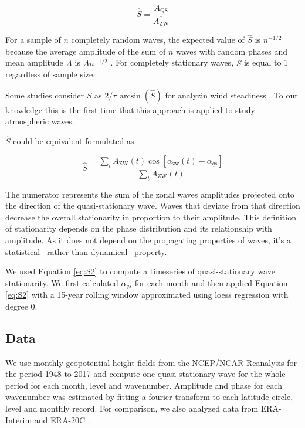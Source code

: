 \documentclass[draft,linenumbers]{agujournal2018}
\begin{document}
\begin{linenomath*}
\begin{equation}\label{eq:S}
\hat{S} = \frac{A_\mathrm{QS}}{\overline{A_\mathrm{ZW}}}
\end{equation}
\end{linenomath*}

For a sample of \(n\) completely random waves, the expected value of
\(\hat{S}\) is \(n^{-1/2}\) because the average amplitude of the sum of
\(n\) waves with random phases and mean amplitude \(A\) is \(An^{-1/2}\)
\citep{pain2005}. For completely stationary waves, \(\hat{S}\) is equal
to 1 regardless of sample size.

Some studies consider \(\hat{S}\) as
\(2/\pi\arcsin \left (\hat{S} \right )\) \citep{singer1967} for analyzin
wind steadiness \citep[e.g][]{hiscox2010}. To our knowledge this is the
first time that this approach is applied to study atmospheric waves.

\(\hat{S}\) could be equivalent formulated as

\begin{linenomath*}
\begin{equation}\label{eq:S2}
\hat{S} =   \frac{\sum_t A_\mathrm{ZW}(t) \cos  \left [\alpha_\mathrm{zw}(t) - \alpha_{qs} \right ]}{\sum_t A_\mathrm{ZW}(t)}
\end{equation}
\end{linenomath*}

The numerator represents the sum of the zonal waves amplitudes projected
onto the direction of the quasi-stationary wave. Waves that deviate from
that direction decrease the overall stationarity in proportion to their
amplitude. This definition of stationarity depends on the phase
distribution and its relationship with amplitude. As it does not depend
on the propagating properties of waves, it's a statistical --rather than
dynamical-- property.

We used Equation \ref{eq:S2} to compute a timeseries of quasi-stationary
wave stationarity. We first calculated \(\alpha_{qs}\) for each month
and then applied Equation \ref{eq:S2} with a 15-year rolling window
approximated using loess regression with degree 0.

\subsection{Data}

We use monthly geopotential height fields from the NCEP/NCAR Reanalysis
\citep{kalnay1996} for the period 1948 to 2017 and compute one
quasi-stationary wave for the whole period for each month, level and
wavenumber. Amplitude and phase for each wavenumber was estimated by
fitting a fourier transform to each latitude circle, level and monthly
record. For comparison, we also analyzed data from ERA-Interim
\citep{dee2011} and ERA-20C \citep{poli2016}.
\end{document}

